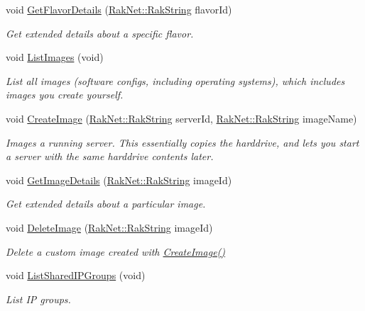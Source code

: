 \begin{DoxyCompactItemize}
void \hyperlink{class_rak_net_1_1_rackspace_ab6af88f36056425a508c5b594f05b151}{Get\-Flavor\-Details} (\hyperlink{class_rak_net_1_1_rak_string}{Rak\-Net\-::\-Rak\-String} flavor\-Id)
\begin{DoxyCompactList}\small\item\em Get extended details about a specific flavor. \end{DoxyCompactList}\item 
void \hyperlink{class_rak_net_1_1_rackspace_afa4e6049bbde4c0c24e0e424155ea984}{List\-Images} (void)
\begin{DoxyCompactList}\small\item\em List all images (software configs, including operating systems), which includes images you create yourself. \end{DoxyCompactList}\item 
void \hyperlink{class_rak_net_1_1_rackspace_a32887a0d78af376a72e8f0351d655570}{Create\-Image} (\hyperlink{class_rak_net_1_1_rak_string}{Rak\-Net\-::\-Rak\-String} server\-Id, \hyperlink{class_rak_net_1_1_rak_string}{Rak\-Net\-::\-Rak\-String} image\-Name)
\begin{DoxyCompactList}\small\item\em Images a running server. This essentially copies the harddrive, and lets you start a server with the same harddrive contents later. \end{DoxyCompactList}\item 
void \hyperlink{class_rak_net_1_1_rackspace_a52b8cc8ee03b5296741a65224a3e1429}{Get\-Image\-Details} (\hyperlink{class_rak_net_1_1_rak_string}{Rak\-Net\-::\-Rak\-String} image\-Id)
\begin{DoxyCompactList}\small\item\em Get extended details about a particular image. \end{DoxyCompactList}\item 
void \hyperlink{class_rak_net_1_1_rackspace_afd356905181b1a4fcb122514f5d07835}{Delete\-Image} (\hyperlink{class_rak_net_1_1_rak_string}{Rak\-Net\-::\-Rak\-String} image\-Id)
\begin{DoxyCompactList}\small\item\em Delete a custom image created with \hyperlink{class_rak_net_1_1_rackspace_a32887a0d78af376a72e8f0351d655570}{Create\-Image()} \end{DoxyCompactList}\item 
void \hyperlink{class_rak_net_1_1_rackspace_a30089576573f2bbdcab57e2f40bd369a}{List\-Shared\-I\-P\-Groups} (void)
\begin{DoxyCompactList}\small\item\em List I\-P groups. \end{DoxyCompactList}\item 

\end{DoxyCompactItemize}
